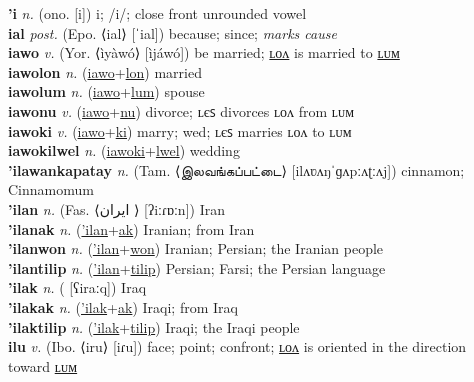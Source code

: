 \textbf{'i} \textit{n.} (ono. [i])
i; /i/; close front unrounded vowel \label{'i} \\
\textbf{ial} \textit{post.} (Epo. ⟨ial⟩ [ˈial])
because; since; \textit{marks cause} \label{ial} \\
\textbf{iawo} \textit{v.} (Yor. ⟨ìyàwó⟩ [ìjáwó])
be married; \hyperref[iawolon]{ʟᴏᴧ} is married to \hyperref[iawolum]{ʟᴜᴍ} \label{iawo} \\
\textbf{iawolon} \textit{n.} (\hyperref[iawo]{iawo}+\hyperref[lon]{lon})
married \label{iawolon} \\
\textbf{iawolum} \textit{n.} (\hyperref[iawo]{iawo}+\hyperref[lum]{lum})
spouse \label{iawolum} \\
\textbf{iawonu} \textit{v.} (\hyperref[iawo]{iawo}+\hyperref[nu]{nu})
divorce; ʟєꜱ divorces ʟᴏᴧ from ʟᴜᴍ \label{iawonu} \\
\textbf{iawoki} \textit{v.} (\hyperref[iawo]{iawo}+\hyperref[ki]{ki})
marry; wed; ʟєꜱ marries ʟᴏᴧ to ʟᴜᴍ \label{iawoki} \\
\textbf{iawokilwel} \textit{n.} (\hyperref[iawoki]{iawoki}+\hyperref[lwel]{lwel})
wedding \label{iawokilwel} \\
\textbf{'ilawankapatay} \textit{n.} (Tam. ⟨இலவங்கப்பட்டை⟩ [ilʌʋʌŋˈɡʌpːʌʈːʌj])
cinnamon; Cinnamomum \label{'ilawankapatay} \\
\textbf{'ilan} \textit{n.} (Fas. ⟨ایران‎ ⟩ [ʔiːɾɒːn])
Iran \label{'ilan} \\
\textbf{'ilanak} \textit{n.} (\hyperref['ilan]{'ilan}+\hyperref[ak]{ak})
Iranian; from Iran \label{'ilanak} \\
\textbf{'ilanwon} \textit{n.} (\hyperref['ilan]{'ilan}+\hyperref[won]{won})
Iranian; Persian; the Iranian people \label{'ilanwon} \\
\textbf{'ilantilip} \textit{n.} (\hyperref['ilan]{'ilan}+\hyperref[tilip]{tilip})
Persian; Farsi; the Persian language \label{'ilantilip} \\
\textbf{'ilak} \textit{n.} ( [ʕiraːq])
Iraq \label{'ilak} \\
\textbf{'ilakak} \textit{n.} (\hyperref['ilak]{'ilak}+\hyperref[ak]{ak})
Iraqi; from Iraq \label{'ilakak} \\
\textbf{'ilaktilip} \textit{n.} (\hyperref['ilak]{'ilak}+\hyperref[tilip]{tilip})
Iraqi; the Iraqi people \label{'ilaktilip} \\
\textbf{ilu} \textit{v.} (Ibo. ⟨iru⟩ [iɾu])
face; point; confront; \hyperref[ilulon]{ʟᴏᴧ} is oriented in the direction toward \hyperref[ilulum]{ʟᴜᴍ} \label{ilu} \\
